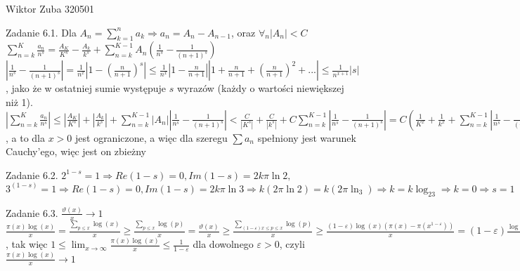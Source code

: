\documentclass{article}
\begin{document}
Wiktor Zuba 320501
\newline

Zadanie 6.1.
\newline
\newline
Dla $A_n=\sum\limits_{k=1}^{n}a_k\Rightarrow a_n=A_n-A_{n-1}$, oraz $\forall_n |A_n|<C$\newline
$\sum\limits_{n=k}^{K}\frac{a_n}{n^s}=\frac{A_K}{K^s}-\frac{A_k}{k^s}+\sum\limits_{n=k}^{K-1}A_n(\frac{1}{n^s}-\frac{1}{(n+1)^{s}})$\newline
$|\frac{1}{n^s}-\frac{1}{(n+1)^s}|=\frac{1}{n^x}|1-(\frac{n}{n+1})^s|\le\frac{1}{n^x}|1-\frac{n}{n+1}||1+\frac{n}{n+1}+(\frac{n}{n+1})^2+...|\le\frac{1}{n^{x+1}}|s|$,
jako że w ostatniej sumie występuje $s$ wyrazów (każdy o wartości niewiększej niż 1).\newline
$|\sum\limits_{n=k}^{K}\frac{a_n}{n^s}|\le|\frac{A_K}{K^s}|+|\frac{A_k}{k^s}|+\sum\limits_{n=k}^{K-1}|A_n||\frac{1}{n^s}-\frac{1}{(n+1)^{s}}|<
\frac{C}{|K^s|}+\frac{C}{|k^s|}+C\sum\limits_{n=k}^{K-1}|\frac{1}{n^s}-\frac{1}{(n+1)^{s}}|=
C(\frac{1}{K^x}+\frac{1}{k^x}+\sum\limits_{n=k}^{K-1}|\frac{1}{n^s}-\frac{1}{(n+1)^{s}}|)\le
C(\frac{1}{K^x}+\frac{1}{k^x}+|s|\sum\limits_{n=k}^{K-1}\frac{1}{n^{x+1}})\le
C(1+1+\sum\limits_{n=1}^{\infty}\frac{1}{n^{x+1}})$, a to dla $x>0$ jest ograniczone, a więc dla szeregu $\sum a_n$ spełniony jest warunek Cauchy'ego, więc jest on zbieżny
\newline

Zadanie 6.2.
\newline
\newline
$2^{1-s}=1\Rightarrow Re(1-s)=0,Im(1-s)=2k\pi\ln2,$ $3^(1-s)=1\Rightarrow Re(1-s)=0,Im(1-s)=2k\pi\ln3\Rightarrow k(2\pi\ln2)=k(2\pi\ln_3)\Rightarrow k=k\log_23\Rightarrow k=0\Rightarrow s=1$
\newline

Zadanie 6.3.
\newline
\newline
$\frac{\vartheta(x)}{x}\rightarrow 1$\newline
$\frac{\pi(x)\log(x)}{x}=\frac{\sum\limits_{p\le x}\log(x)}{x}\ge\frac{\sum\limits_{p\le x}\log(p)}{x}=\frac{\vartheta(x)}{x}\ge
\frac{\sum\limits_{(1-\varepsilon)x\le p\le x}\log(p)}{x}\ge \frac{(1-\varepsilon)\log(x)(\pi(x)-\pi(x^{1-\varepsilon}))}{x}=(1-\varepsilon)\frac{\log(x)\pi(x)}{x}+\frac{O(x)}{x}$,\newline
tak więc $1\le\lim_{x\rightarrow\infty}\frac{\pi(x)\log(x)}{x}\le\frac{1}{1-\varepsilon}$ dla dowolnego $\varepsilon>0$, czyli $\frac{\pi(x)\log(x)}{x}\rightarrow 1$
\newline
\end{document}
